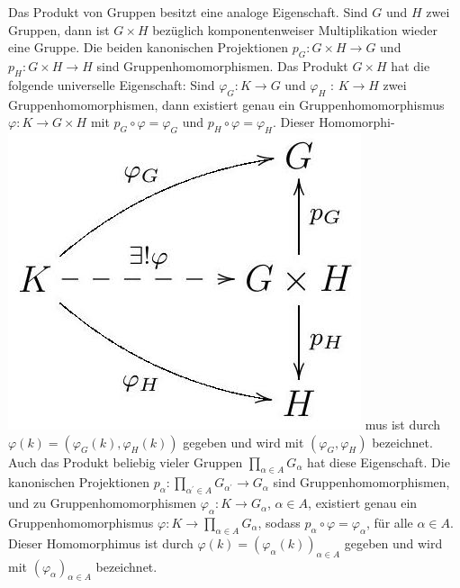 \documentclass[10pt, letterpaper]{article}
\begin{document}
Das Produkt von Gruppen besitzt eine analoge Eigenschaft. Sind $G$ und $H$ zwei Gruppen, dann ist $G \times H$ bezüglich komponentenweiser Multiplikation wieder eine Gruppe. Die beiden kanonischen Projektionen $p_{G}: G \times H \rightarrow G$ und $p_{H}: G \times H \rightarrow H$ sind Gruppenhomomorphismen. Das Produkt $G \times H$ hat die folgende universelle Eigenschaft: Sind $\varphi_{G}: K \rightarrow G$ und $\varphi_{H}$ : $K \rightarrow H$ zwei Gruppenhomomorphismen, dann existiert genau ein Gruppenhomomorphismus $\varphi: K \rightarrow G \times H$ mit $p_{G} \circ \varphi=\varphi_{G}$ und $p_{H} \circ \varphi=\varphi_{H}$. Dieser Homomorphi-\\
\includegraphics[max width=\textwidth]{2025_06_05_d7ed2bacd1e9ce1db1f0g-010} mus ist durch $\varphi(k)=\left(\varphi_{G}(k), \varphi_{H}(k)\right)$ gegeben und wird mit $\left(\varphi_{G}, \varphi_{H}\right)$ bezeichnet. Auch das Produkt beliebig vieler Gruppen $\prod_{\alpha \in A} G_{\alpha}$ hat diese Eigenschaft. Die kanonischen Projektionen $p_{\alpha}: \prod_{\alpha^{\prime} \in A} G_{\alpha^{\prime}} \rightarrow G_{\alpha}$ sind Gruppenhomomorphismen, und zu Gruppenhomomorphismen $\varphi_{\alpha}: K \rightarrow G_{\alpha}$, $\alpha \in A$, existiert genau ein Gruppenhomomorphismus $\varphi: K \rightarrow \prod_{\alpha \in A} G_{\alpha}$, sodass $p_{\alpha} \circ \varphi=\varphi_{\alpha}$, für alle $\alpha \in A$. Dieser Homomorphimus ist durch $\varphi(k)=\left(\varphi_{\alpha}(k)\right)_{\alpha \in A}$ gegeben und wird mit $\left(\varphi_{\alpha}\right)_{\alpha \in A}$ bezeichnet.
\end{document}
